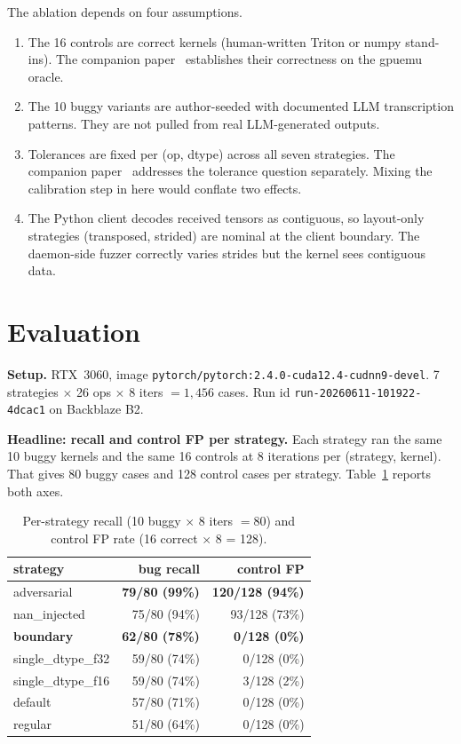 \documentclass[runningheads]{llncs}
\begin{document}
The ablation depends on four assumptions.

\begin{enumerate}
\item The 16 controls are correct kernels (human-written Triton or
numpy stand-ins). The companion paper~\cite{gpuemuP1} establishes their
correctness on the gpuemu oracle.
\item The 10 buggy variants are author-seeded with documented LLM
transcription patterns. They are not pulled from real LLM-generated
outputs.
\item Tolerances are fixed per (op, dtype) across all seven strategies.
The companion paper~\cite{gpuemuP2} addresses the tolerance question
separately. Mixing the calibration step in here would conflate two
effects.
\item The Python client decodes received tensors as contiguous, so
layout-only strategies (transposed, strided) are nominal at the client
boundary. The daemon-side fuzzer correctly varies strides but the
kernel sees contiguous data.
\end{enumerate}

\section{Evaluation}
\label{sec:eval}

\textbf{Setup.} RTX~3060, image
\texttt{pytorch/pytorch:2.4.0-cuda12.4-cudnn9-devel}. 7 strategies
$\times$ 26 ops $\times$ 8 iters $= 1{,}456$ cases. Run id
\texttt{run-20260611-101922-4dcac1} on Backblaze B2.

\textbf{Headline: recall and control FP per strategy.}
Each strategy ran the same 10 buggy kernels and the same 16 controls
at 8 iterations per (strategy, kernel). That gives 80 buggy cases
and 128 control cases per strategy. Table~\ref{tab:headline} reports
both axes.

\begin{table}[h]
\centering
\caption{Per-strategy recall (10 buggy $\times$ 8 iters $= 80$) and
control FP rate (16 correct $\times$ 8 = 128).}
\label{tab:headline}
\begin{tabular}{lrr}
\toprule
strategy & bug recall & control FP \\
\midrule
adversarial               & \textbf{79/80 (99\%)}  & \textbf{120/128 (94\%)} \\
nan\_injected             & 75/80 (94\%)           & 93/128 (73\%) \\
\textbf{boundary}         & \textbf{62/80 (78\%)}  & \textbf{0/128 (0\%)} \\
single\_dtype\_f32        & 59/80 (74\%)           & 0/128 (0\%) \\
single\_dtype\_f16        & 59/80 (74\%)           & 3/128 (2\%) \\
default                   & 57/80 (71\%)           & 0/128 (0\%) \\
regular                   & 51/80 (64\%)           & 0/128 (0\%) \\
\bottomrule
\end{tabular}
\end{table}
\end{document}
